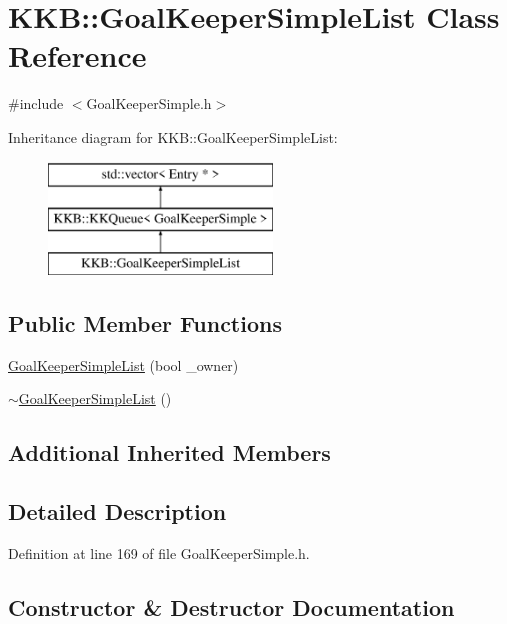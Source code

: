 \hypertarget{class_k_k_b_1_1_goal_keeper_simple_list}{}\section{K\+KB\+:\+:Goal\+Keeper\+Simple\+List Class Reference}
\label{class_k_k_b_1_1_goal_keeper_simple_list}


{\ttfamily \#include $<$Goal\+Keeper\+Simple.\+h$>$}

Inheritance diagram for K\+KB\+:\+:Goal\+Keeper\+Simple\+List\+:\begin{figure}[H]
\begin{center}
\leavevmode
\includegraphics[height=3.000000cm]{class_k_k_b_1_1_goal_keeper_simple_list}
\end{center}
\end{figure}
\subsection*{Public Member Functions}
\begin{DoxyCompactItemize}
\item 
\hyperlink{class_k_k_b_1_1_goal_keeper_simple_list_ac0892b0284e98f55ec1c670e43499127}{Goal\+Keeper\+Simple\+List} (bool \+\_\+owner)
\item 
\hyperlink{class_k_k_b_1_1_goal_keeper_simple_list_a85c1cec64e9d0df5c15885853fd18c65}{$\sim$\+Goal\+Keeper\+Simple\+List} ()
\end{DoxyCompactItemize}
\subsection*{Additional Inherited Members}


\subsection{Detailed Description}


Definition at line 169 of file Goal\+Keeper\+Simple.\+h.



\subsection{Constructor \& Destructor Documentation}
